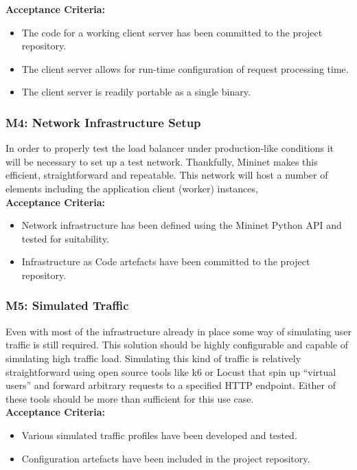 \textbf{Acceptance Criteria:}
\begin{itemize}
    \item The code for a working client server has been committed to the project repository.
    \item The client server allows for run-time configuration of request processing time.
    \item The client server is readily portable as a single binary.
\end{itemize}

\subsubsection{M4: Network Infrastructure Setup}
In order to properly test the load balancer under production-like conditions it will be necessary to set up a test network. Thankfully, Mininet makes this efficient, straightforward and repeatable. This network will host a number of elements including the application client (worker) instances, \\

\textbf{Acceptance Criteria:}
\begin{itemize}
    \item Network infrastructure has been defined using the Mininet Python API and tested for suitability.
    \item Infrastructure as Code artefacts have been committed to the project repository.
\end{itemize}

\subsubsection{M5: Simulated Traffic}
Even with most of the infrastructure already in place some way of simulating user traffic is still required. This solution should be highly configurable and capable of simulating high traffic load. Simulating this kind of traffic is relatively straightforward using open source tools like k6 or Locust that spin up ``virtual users'' and forward arbitrary requests to a specified HTTP endpoint. Either of these tools should be more than sufficient for this use case. \\

\textbf{Acceptance Criteria:}
\begin{itemize}
    \item Various simulated traffic profiles have been developed and tested.
    \item Configuration artefacts have been included in the project repository.
\end{itemize}

